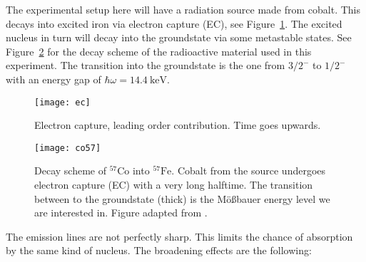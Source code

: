 \documentclass[11pt, english, fleqn, DIV=15, headinclude, BCOR=2cm]{scrreprt}
\begin{document}
The experimental setup here will have a radiation source made from cobalt. This
decays into excited iron via electron capture (EC), see Figure~\ref{fig:ec}.
The excited nucleus in turn will decay into the groundstate via some
metastable states. See Figure~\ref{fig:co57} for the decay scheme of the
radioactive material used in this experiment. The transition into the
groundstate is the one from $3/2^-$ to $1/2^-$ with an energy gap of $\hbar
\omega = \SI{14.4}{\kilo\electronvolt}$.

\begin{figure}
    \centering
    \texttt{[image: ec]}
    \caption{%
        Electron capture, leading order contribution. Time goes upwards.
    }
    \label{fig:ec}
\end{figure}

\begin{figure}
    \centering
    \texttt{[image: co57]}
    \caption{%
        Decay scheme of $^{57}\mathrm{Co}$ into $^{57}\mathrm{Fe}$. Cobalt from
        the source undergoes electron capture (EC) with a very long halftime.
        The transition between to the groundstate (thick) is the Mößbauer
        energy level we are interested in.
        Figure adapted from
        \textcite[Abb.~4.8]{Schatz/Nukleare_Festkoerperphysik}.
    }
    \label{fig:co57}
\end{figure}

The emission lines are not perfectly sharp. This limits the chance of
absorption by the same kind of nucleus. The broadening effects are the
following:
\end{document}
